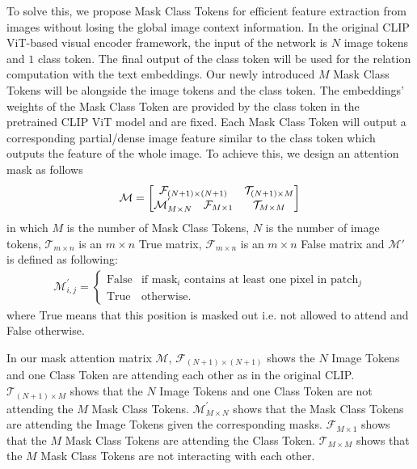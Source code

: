 \documentclass{article}
\theoremstyle{plain}
\theoremstyle{definition}
\theoremstyle{remark}
\newcommand\calM{\mathcal{M}}
\begin{document}
To solve this, we propose Mask Class Tokens for efficient feature extraction from images without losing the global image context information. In the original CLIP ViT-based visual encoder framework, the input of the network is $N$ image tokens and $1$ class token. The final output of the class token will be used for the relation computation with the text embeddings. Our newly introduced $M$ Mask Class Tokens will be alongside the image tokens and the class token. The embeddings' weights of the Mask Class Token are provided by the class token in the pretrained CLIP ViT model and are fixed. Each Mask Class Token will output a corresponding partial/dense image feature similar to the class token which outputs the feature of the whole image. To achieve this, we design an attention mask as follows
\begin{align}
    \calM = \begin{bmatrix}
\multicolumn{2}{c}{\mathcal{F}_{(N+1)\times (N+1)}} & \mathcal{T}_{(N+1)\times M}\\
 \mathcal{M}^{'}_{M\times N} & \mathcal{F}_{M\times 1} & \mathcal{T}_{M\times M}
\end{bmatrix}
\label{eq:attn_mask}
\end{align}
in which $M$ is the number of Mask Class Tokens, $N$ is the number of image tokens, $\mathcal{T}_{m\times n}$ is an $m\times n$ True matrix, $\mathcal{F}_{m\times n}$ is an $m\times n$ False matrix and $\calM'$ is defined as following:
\begin{align}
    \calM^\prime_{i,j} =     \begin{cases}
      \text{False} & \text{if mask$_{i}$ contains at least one pixel in patch$_{j}$}\\
      \text{True} & \text{otherwise.}
    \end{cases}
\end{align}
where True means that this position is masked out i.e. not allowed to attend and False otherwise. 

 In our mask attention matrix $\calM$, $\mathcal{F}_{(N+1)\times (N+1)}$ shows the $N$ Image Tokens and one Class Token are attending each other as in the original CLIP. $\mathcal{T}_{(N+1)\times M}$ shows that the $N$ Image Tokens and one Class Token are not attending the $M$ Mask Class Tokens. $\mathcal{M}^{'}_{M\times N}$ shows that the Mask Class Tokens are attending the Image Tokens given the corresponding masks. $\mathcal{F}_{M\times 1}$ shows that the $M$ Mask Class Tokens are attending the Class Token. $\mathcal{T}_{M\times M}$ shows that the $M$ Mask Class Tokens are not interacting with each other.
\end{document}
